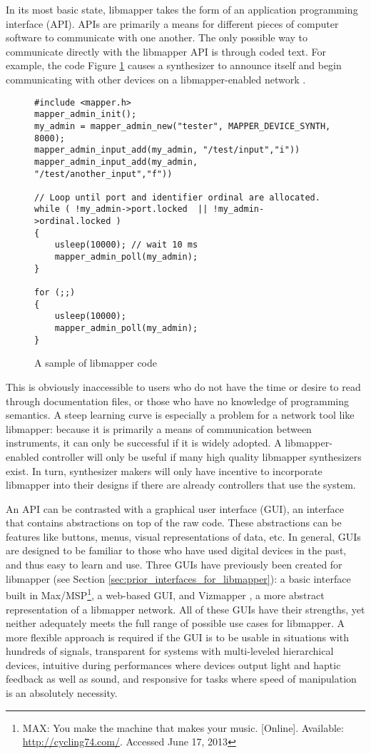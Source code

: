 In its most basic state, libmapper takes the form of an application programming interface (API). APIs are primarily a means for different pieces of computer software to communicate with one another. The only possible way to communicate directly with the libmapper API is through coded text. For example, the code Figure \ref{fig:libmapper_code} causes a synthesizer to announce itself and begin communicating with other devices on a libmapper-enabled network .

\begin{figure}[ht!]
\begin{lstlisting}[]
#include <mapper.h>
mapper_admin_init();
my_admin = mapper_admin_new("tester", MAPPER_DEVICE_SYNTH, 8000); 
mapper_admin_input_add(my_admin, "/test/input","i")) 
mapper_admin_input_add(my_admin, "/test/another_input","f"))

// Loop until port and identifier ordinal are allocated. 
while ( !my_admin->port.locked	|| !my_admin->ordinal.locked )
{
	usleep(10000); // wait 10 ms 
	mapper_admin_poll(my_admin);
}

for (;;) 
{
	usleep(10000);
	mapper_admin_poll(my_admin); 
}
\end{lstlisting}
\caption{A sample of libmapper code}
\label{fig:libmapper_code}
\end{figure}

This is obviously inaccessible to users who do not have the time or desire to read through documentation files, or those who have no knowledge of programming semantics. A steep learning curve is especially a problem for a network tool like libmapper: because it is primarily a means of communication between instruments, it can only be successful if it is widely adopted. A libmapper-enabled controller will only be useful if many high quality libmapper synthesizers exist. In turn, synthesizer makers will only have incentive to incorporate libmapper into their designs if there are already controllers that use the system. 

An API can be contrasted with a graphical user interface (GUI), an interface that contains abstractions on top of the raw code. These abstractions can be features like buttons, menus, visual representations of data, etc. In general, GUIs are designed to be familiar to those who have used digital devices in the past, and thus easy to learn and use. Three GUIs have previously been created for libmapper (see Section \ref{sec:prior_interfaces_for_libmapper}): a basic interface built in Max/MSP\footnote{MAX: You make the machine that makes your music. [Online]. Available: \url{http://cycling74.com/}. Accessed June 17, 2013}, a web-based GUI, and Vizmapper \cite{vizmapper}, a more abstract representation of a libmapper network. All of these GUIs have their strengths, yet neither adequately meets the full range of possible use cases for libmapper. A more flexible approach is required if the GUI is to be usable in situations with hundreds of signals, transparent for systems with multi-leveled hierarchical devices, intuitive during performances where devices output light and haptic feedback as well as sound, and responsive for tasks where speed of manipulation is an absolutely necessity. 

